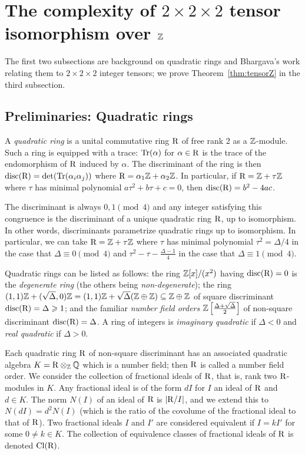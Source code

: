 \section{The complexity of $2\times 2\times 2$ tensor isomorphism over $\mathbb{Z}$}


The first two subsections are background on quadratic rings and Bhargava's work relating them to $2 \times 2 \times 2$ integer tensors; we prove Theorem~\ref{thm:tensorZ} in the third subsection.


\subsection{Preliminaries: Quadratic rings}

A \emph{quadratic ring} is a unital commutative ring $\mathrm{R}$ of free rank $2$ as a $\mathbb{Z}$-module.  Such a ring is equipped with a trace: $\mathrm{Tr}(\alpha)$ for $\alpha \in \mathrm{R}$ is the trace of the endomorphism of $\mathrm{R}$ induced by $\alpha$.  The discriminant of the ring is then $\operatorname{disc}(\mathrm{R}) = \det(\mathrm{Tr}(\alpha_i\alpha_j))$ where $\mathrm{R} = \alpha_1 \mathbb{Z} + \alpha_2 \mathbb{Z}$.  In particular, if $\mathrm{R} = \mathbb{Z} + \tau \mathbb{Z}$ where $\tau$ has minimal polynomial $a\tau^2 + b\tau + c = 0$, then $\operatorname{disc}(\mathrm{R}) = b^2 - 4ac$.  

The discriminant is always $0, 1 \pmod{4}$ and any integer satisfying this congruence is the discriminant of a unique quadratic ring $\mathrm{R}$, up to isomorphism.  In other words, discriminants parametrize quadratic rings up to isomorphism.
In particular, we can take $\mathrm{R} = \mathbb{Z} + \tau \mathbb{Z}$ where $\tau$ has minimal polynomial $\tau^2 = \Delta/4$ in the case that $\Delta \equiv 0 \pmod{4}$ and $\tau^2 - \tau - \frac{\Delta-1}{4}$ in the case that $\Delta \equiv 1 \pmod{4}$.  

Quadratic rings can be listed as follows:  the ring $\mathbb{Z}[x]/(x^2)$ having $\operatorname{disc}(\mathrm{R})=0$ is the \emph{degenerate ring} (the others being \emph{non-degenerate}); the ring $(1,1)\mathbb{Z} + (\sqrt{\Delta},0)\mathbb{Z} = (1,1)\mathbb{Z} + \sqrt{\Delta}(\mathbb{Z} \oplus \mathbb{Z}) \subseteq \mathbb{Z} \oplus \mathbb{Z}$ of square discriminant $\operatorname{disc}(\mathrm{R}) = \Delta \geqslant 1$; and the familiar \emph{number field orders} $\mathbb{Z} \left[ \frac{\Delta+\sqrt{\Delta}}{2} \right]$ of non-square discriminant $\operatorname{disc}(\mathrm{R}) = \Delta$.  A ring of integers is \emph{imaginary quadratic} if $\Delta < 0$ and \emph{real quadratic} if $\Delta > 0$.

Each quadratic ring $\mathrm{R}$ of non-square discriminant has an associated quadratic algebra $K = \mathrm{R} \otimes_{\mathbb{Z}} \mathbb{Q}$ which is a number field; then $\mathrm{R}$ is called a number field order.  We consider the collection of fractional ideals of $\mathrm{R}$, that is, rank two $\mathrm{R}$-modules in $K$.  Any fractional ideal is of the form $dI$ for $I$ an ideal of $\mathrm{R}$ and $d\in K$.  The norm $N(I)$ of an ideal of $\mathrm{R}$ is $|\mathrm{R}/I|$, %
and we extend this to $N(dI) = d^2 N(I)$ (which is the ratio of the covolume of the fractional ideal to that of $\mathrm{R}$).  Two fractional ideals $I$ and $I'$ are considered equivalent if $I = k I'$ for some $0 \neq k \in K$.  The collection of equivalence classes of fractional ideals of $\mathrm{R}$ is denoted $\operatorname{Cl}(\mathrm{R})$.

